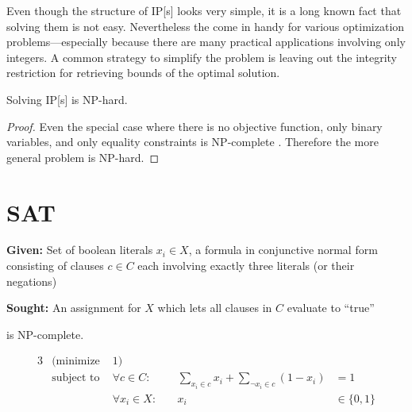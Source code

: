 Even though the structure of \gls{IP}[s] looks very simple, it is a
long known fact that solving them is not easy. Nevertheless the come
in handy for various optimization problems---especially because there
are many practical applications involving only integers. A common
strategy to simplify the problem is leaving out the integrity
restriction for retrieving bounds of the optimal solution.

\begin{theorem}
  Solving \gls{IP}[s] is NP-hard.
\end{theorem}

\begin{proof}
  Even the special case where there is no objective function, only
  binary variables, and only equality constraints is NP-complete
  \cite{karp_np_complete}. Therefore the more general problem is
  NP-hard.
\end{proof}

\section{SAT}

\begin{problem}[3-SAT]
  \label{prob:3SAT}\hfill
  \begin{labeling}{\hspace{4em}}
    \item[\textbf{Given:}]
      Set of boolean literals \(x_i \in X\), a formula in conjunctive 
      normal form consisting of clauses \(c \in C\) each involving 
      exactly three literals (or their negations)
    \item[\textbf{Sought:}]
      An assignment for \(X\) which lets all clauses in \(C\) evaluate
      to ``true''
  \end{labeling}
\end{problem}


\begin{theorem}
   is NP-complete.~\cite[Satisfiability with at most %
  3 Literals per Clause]{karp_np_complete}
\end{theorem}


\begin{problem}
  \begin{alignat*}{3}
    &(\text{minimize } & 1) \\
    &\text{subject to } & \forall c \in C : &~
    & \sum\limits_{x_i \in c} x_i + \sum\limits_{\lnot x_i \in c} (1 - x_i) &= 1 \\
    && \forall x_i \in X : &~& x_i &\in \{0,1\}
  \end{alignat*}
\end{problem}

